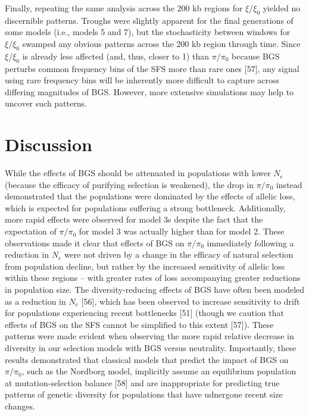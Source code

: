 \documentclass[9pt,twocolumn,twoside]{rilabRxiv}
\begin{document}
Finally, repeating the same analysis across the 200 kb regions for
$\xi/\xi_0$ yielded no discernible patterns. Troughs were
slightly apparent for the final generations of some models (i.e., models
5 and 7), but the stochasticity between windows for $\xi/\xi_0$
swamped any obvious patterns across the 200 kb region through time.
Since $\xi/\xi_0$ is already less affected (and, thus, closer
to 1) than $\pi/\pi_0$ because BGS perturbs common frequency
bins of the SFS more than rare ones [57], any signal using rare
frequency bins will be inherently more difficult to capture across
differing magnitudes of BGS. However, more extensive simulations may
help to uncover such patterns.


\section{Discussion}

While the effects of BGS should be attenuated in populations with lower $N_e$ (because the efficacy of purifying selection is weakened), the drop in $\pi/\pi_0$ instead demonstrated that the populations were dominated by the effects of allelic loss, which is expected for populations suffering a strong bottleneck.
Additionally, more rapid effects were observed for model 3s despite the fact that the expectation of $\pi/\pi_0$ for model 3 was actually higher than for model 2.
These observations made it clear that effects of BGS on $\pi/\pi_0$ immediately following a reduction in $N_e$ were not driven by a change in the efficacy of natural selection from population decline, but rather by the increased sensitivity of allelic loss within these regions -- with greater rates of loss accompanying greater reductions in population size.
The diversity-reducing effects of BGS have often been modeled as a reduction in $N_e$ [56], which has been observed to increase sensitivity to drift for populations experiencing recent bottlenecks [51] (though we caution that effects of BGS on the SFS cannot be simplified to this extent [57]).
These patterns were made evident when observing the more rapid relative decrease in diversity in our selection models with BGS versus neutrality.
Importantly, these results demonstrated that classical models that predict the impact of BGS on $\pi/\pi_0$, such as the Nordborg model, implicitly assume an equilibrium population at  mutation-selection balance [58] and are inappropriate for predicting true patterns of genetic diversity for populations that have udnergone recent size changes.
\end{document}
